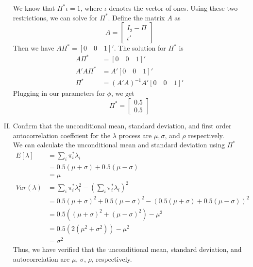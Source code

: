 \documentclass[french]{article}
\begin{document}
\begin{enumerate}[I.]
	We know that $\Pi^*\iota = 1$, where $\iota$ denotes the vector of ones. Using these two restrictions, we can solve for $\Pi^*$. Define the matrix $A$ as 
	\begin{equation*}
		A = \begin{bmatrix}
		I_2 - \Pi \\ \iota'
		\end{bmatrix}
	\end{equation*}
	Then we have $A\Pi^* = \left[0\quad0\quad 1\right]'$. The solution for $\Pi^*$ is 
	\begin{equation*}
	\begin{split}
	A\Pi^* &= \left[0\quad0\quad 1\right]'\\
	A'A\Pi^* &= A'\left[0\quad0\quad 1\right]'\\
	\Pi^* &= (A'A)^{-1}A'\left[0 \quad 0 \quad 1\right]'
	\end{split}
	\end{equation*}
	Plugging in our parameters for $\phi$, we get 
	\begin{equation*}
		\Pi^* =	
		\begin{bmatrix}
		0.5\\ 0.5
		\end{bmatrix}
	\end{equation*}
	\item Confirm that the unconditional mean, standard deviation, and first order autocorrelation coeffcient for the $\lambda$ process are $\mu, \sigma$, and $\rho$ respectively. \\
	
	We can calculate the unconditional mean and standard deviation using $\Pi^*$
	\begin{equation*}
		\begin{split}
		E\left[\lambda\right] &= \sum_i \pi_{i}^*\lambda_i\\
		&= 0.5 (\mu+\sigma) + 0.5(\mu -\sigma)\\
		&= \mu\\
		Var(\lambda)&= \sum_i \pi_{i}^* \lambda_i^2 - \left(\sum_i \pi_{i}^*\lambda_i\right)^2\\
		&=0.5 (\mu+\sigma)^2 + 0.5(\mu -\sigma)^2 - (0.5 (\mu+\sigma) + 0.5(\mu -\sigma))^2\\
		&= 0.5( (\mu+\sigma)^2 +(\mu -\sigma)^2) - \mu^2\\
		&=  0.5( 2(\mu^2+\sigma^2)) - \mu^2\\
		& = \sigma^2
		\end{split}
	\end{equation*}
	Thus, we have verified that the unconditional mean, standard deviation, and autocorrelation are $\mu$, $\sigma$, $\rho$,  respectively.
\end{enumerate}
\end{document}
